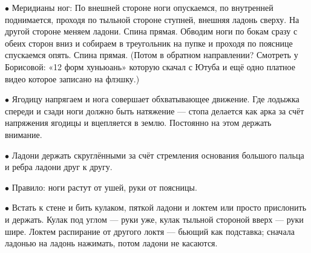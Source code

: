 \item{$\bullet$} Меридианы ног:
 По внешней стороне ноги опускаемся, по внутренней поднимается, проходя по тыльной стороне ступней, внешняя ладонь сверху. На другой стороне меняем ладони. Спина прямая.
 Обводим ноги по бокам сразу с обеих сторон вниз и собираем в треугольник на пупке и проходя по пояснице спускаемся опять. Спина прямая. (Потом в обратном направлении? Смотреть у Борисовой: «12 форм хуньюань» которую скачал с Ютуба и ещё одно платное видео которое записано на флэшку.)

\item{$\bullet$} Ягодицу напрягаем и нога совершает обхватывающее движение.
Где лодыжка спереди и сзади ноги должно быть натяжение --- стопа делается как арка за счёт напряжения ягодицы и вцепляется в землю. Постоянно на этом держать внимание.

\item{$\bullet$} Ладони держать скруглёнными за счёт стремления основания большого пальца и ребра ладони друг к другу.

\item{$\bullet$} Правило: ноги растут от ушей, руки от поясницы.

\item{$\bullet$} Встать к стене и бить кулаком, пяткой ладони и локтем или просто прислонить и держать. Кулак под углом --- руки уже, кулак тыльной стороной вверх --- руки шире. Локтем распирание от другого локтя --- бьющий как подставка; сначала ладонью на ладонь нажимать, потом ладони не касаются.

\bye
